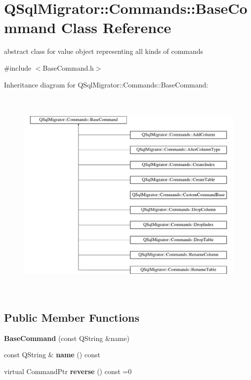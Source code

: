 \hypertarget{class_q_sql_migrator_1_1_commands_1_1_base_command}{}\section{Q\+Sql\+Migrator\+:\+:Commands\+:\+:Base\+Command Class Reference}
\label{class_q_sql_migrator_1_1_commands_1_1_base_command}


abstract class for value object representing all kinds of commands  




{\ttfamily \#include $<$Base\+Command.\+h$>$}

Inheritance diagram for Q\+Sql\+Migrator\+:\+:Commands\+:\+:Base\+Command\+:\begin{figure}[H]
\begin{center}
\leavevmode
\includegraphics[height=10.547945cm]{class_q_sql_migrator_1_1_commands_1_1_base_command}
\end{center}
\end{figure}
\subsection*{Public Member Functions}
\begin{DoxyCompactItemize}
\item 
\mbox{\label{class_q_sql_migrator_1_1_commands_1_1_base_command_a094fb40f8e1b3b4a92ed45f2a3e2265c}} 
{\bfseries Base\+Command} (const Q\+String \&name)
\item 
\mbox{\label{class_q_sql_migrator_1_1_commands_1_1_base_command_a6d19144ca137f08f5abd4b3bcd684ffd}} 
const Q\+String \& {\bfseries name} () const
\item 
\mbox{\label{class_q_sql_migrator_1_1_commands_1_1_base_command_a8ea5d829d9c2a7bb5f79652cbf76c53d}} 
virtual Command\+Ptr {\bfseries reverse} () const =0
\end{DoxyCompactItemize}


